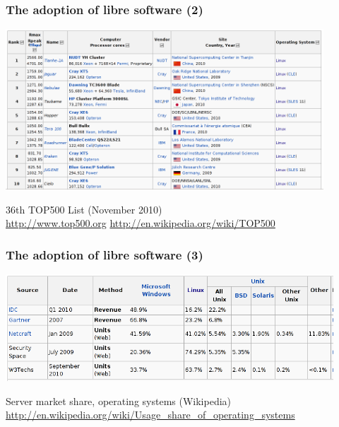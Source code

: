 
\begin{frame}
\frametitle{The adoption of libre software (2)}

\includegraphics[height=6cm]{top-10-supercomputers-2010-11}

\begin{flushright}
36th TOP500 List (November 2010) \\
{\small \url{http://www.top500.org} \url{http://en.wikipedia.org/wiki/TOP500}} 
\end{flushright}
\end{frame}


\begin{frame}
\frametitle{The adoption of libre software (3)}

\begin{center}
\includegraphics[height=4cm]{server-os-share-2010}
\end{center}

\begin{flushright}
Server market share, operating systems (Wikipedia) \\
{\footnotesize \url{http://en.wikipedia.org/wiki/Usage_share_of_operating_systems}} 
\end{flushright}
\end{frame}


